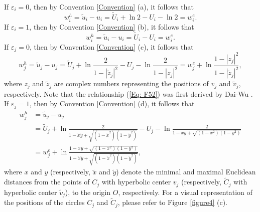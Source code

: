 \documentclass[12pt]{amsart}
\theoremstyle{definition}
\begin{document}
If $\varepsilon_i=0$, then by Convention \ref{Convention} (a), it follows that
\begin{equation}\label{wie0}
w^h_i=\tilde{u}_i-u_i
=\tilde{U}_i+\ln 2-U_i-\ln 2
=w^e_i.
\end{equation}
If $\varepsilon_i=1$, then by Convention \ref{Convention} (b), it follows that
\begin{equation}\label{wie1}
w^h_i=\tilde{u}_i-u_i
=\tilde{U}_i-U_i
=w^e_i.
\end{equation}
If $\varepsilon_j=0$, then by Convention \ref{Convention} (c), it follows that
\begin{equation}\label{Eq: F52}
w^h_j=\tilde{u}_j-u_j
=\tilde{U}_j+\ln \frac{2}{1-|\tilde{z}_j|^2}
-U_j-\ln \frac{2}{1-|z_j|^2}=w^e_j+\ln\frac{1-|z_j|^2}{1-|\tilde{z}_j|^2},
\end{equation}
where $z_j$ and $\tilde{z}_j$ are complex numbers representing the positions of $v_j$ and $\tilde{v}_j$, respectively.
Note that the relationship (\ref{Eq: F52}) was first derived by Dai-Wu \cite[Lemma 2.3]{Dai-Wu}.
If $\varepsilon_j=1$, then by Convention \ref{Convention} (d), it follows that
\begin{equation}\label{Eq: F54}
\begin{aligned}
w^h_j
&=\tilde{u}_j-u_j\\
&=\tilde{U}_j+\ln \frac{2}{1-\tilde{x}\tilde{y}+\sqrt{(1-\tilde{x}^2)(1-\tilde{y}^2)}}
-U_j-\ln \frac{2}{1-xy+\sqrt{(1-x^2)(1-y^2)}}\\
&=w^e_j+\ln\frac{1-xy+\sqrt{(1-x^2)(1-y^2)}}{1-\tilde{x}\tilde{y}+\sqrt{(1-\tilde{x}^2)(1-\tilde{y}^2)}},
\end{aligned}
\end{equation}
where $x$ and $y$ (respectively, $\tilde{x}$ and $\tilde{y}$) denote the minimal and maximal Euclidean distances from the points of $C_j$ with hyperbolic center $v_j$ (respectively, $\tilde{C}_j$ with hyperbolic center $\tilde{v}_j$), to the origin $O$, respectively.
For a visual representation of the positions of the circles $C_j$ and $\tilde{C}_j$, please refer to Figure \ref{figure4} (c).
\end{document}
